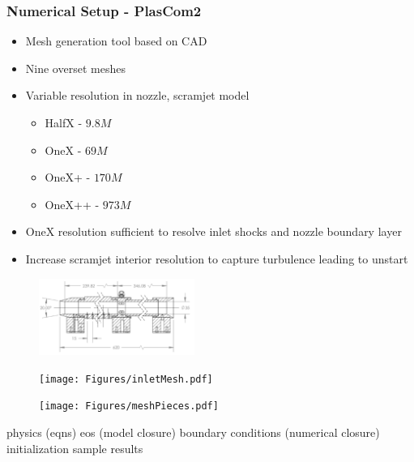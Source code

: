 \documentclass{beamer}
\begin{document}
\begin{frame}\frametitle{Numerical Setup - PlasCom2}

\vspace{10pt}
	\begin{minipage}{0.59\textwidth}
	  \begin{itemize}
	    \item Mesh generation tool based on CAD
	    \item Nine overset meshes
	    \item Variable resolution in nozzle, scramjet model
 	    \begin{itemize}
			\item HalfX - $9.8 M$
			\item OneX - $69 M$
			\item OneX+ - $170 M$
			\item OneX++ - $973 M$
 	    \end{itemize}
	    \item OneX resolution sufficient to resolve inlet shocks and nozzle boundary layer
	    \item Increase scramjet interior resolution to capture turbulence leading to unstart
	  \end{itemize}
	\end{minipage}
	\begin{minipage}{0.39\textwidth}
	\begin{figure}

		\centering
	  \includegraphics[width=2in]{Figures/CAD.pdf}
	\end{figure}
	\vspace{-15pt}
	\begin{figure}
		\centering
 		\texttt{[image: Figures/inletMesh.pdf]}
	\end{figure}
	\end{minipage}
	\begin{figure}
	\centering
	\texttt{[image: Figures/meshPieces.pdf]}
	\end{figure}

\end{frame}

\begin{frame}
physics (eqns)
eos (model closure)
boundary conditions (numerical closure)
initialization
sample results
\end{frame}
\end{document}
